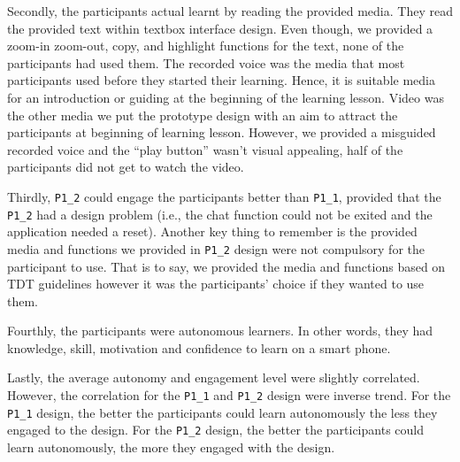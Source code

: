 Secondly, the participants actual learnt by reading the provided media. They read the provided text within textbox interface design. Even though, we provided a zoom-in zoom-out, copy, and highlight functions for the text, none of the participants had used them. The recorded voice was the media that most participants used before they started their learning. Hence, it is suitable media for an introduction or guiding at the beginning of the learning lesson. Video was the other media we put the prototype design with an aim to attract the participants at beginning of learning lesson. However, we provided a misguided recorded voice and the ``play button'' wasn't visual appealing, half of the participants did not get to watch the video. 

Thirdly, \verb|P1_2| could engage the participants better than \verb|P1_1|, provided that the \verb|P1_2| had a design problem (i.e., the chat function could not be exited and the application needed a reset). Another key thing to remember is the provided media and functions we provided in \verb|P1_2| design were not compulsory for the participant to use. That is to say, we provided the media and functions based on TDT guidelines however it was the participants’ choice if they wanted to use them. 

Fourthly, the participants were autonomous learners. In other words, they had knowledge, skill, motivation and confidence to learn on a smart phone. 

Lastly, the average autonomy and engagement level were slightly correlated. However, the correlation for the \verb|P1_1| and \verb|P1_2| design were inverse trend. For the \verb|P1_1| design, the better the participants could learn autonomously the less they engaged to the design. For the \verb|P1_2| design, the better the participants could learn autonomously, the more they engaged with the design. 



